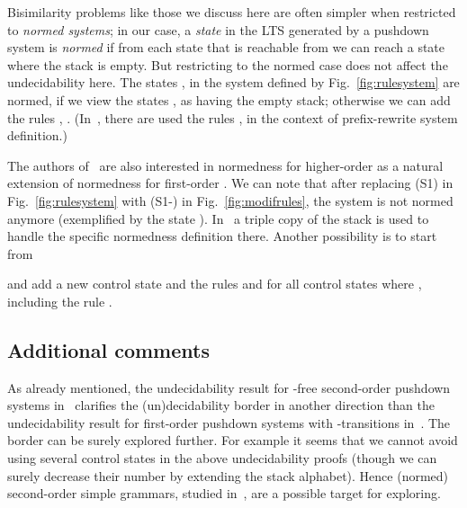 \documentclass[11pt]{article}
\newcommand{\pda}{\text{PDA}\xspace}
\begin{document}
Bisimilarity problems like those we discuss here
are
often simpler when restricted to \emph{normed systems};
in our case, a \emph{state}  in the LTS generated by  
a pushdown system is  \emph{normed} if from each
state that is reachable from  we can reach 
a state where the stack is empty.
But restricting to the normed case does not affect the undecidability
here.
The states ,  in the system 
defined by
Fig.~\ref{fig:rulesystem} are normed, if 
we view the states ,  as having the empty stack;
otherwise we can add
the rules
,
.
(In~\cite{DBLP:journals/jacm/JancarS08}, there are used
the rules ,
 in the context 
of prefix-rewrite system definition.)

The authors of~\cite{DBLP:conf/fsttcs/BroadbentG12} 
are also interested in normedness for higher-order \pda as a natural extension of normedness for
first-order \pda.
We can note that after replacing (S1) in 
Fig.~\ref{fig:rulesystem}
with (S1-)
in Fig.~\ref{fig:modifrules}, the system is
not normed anymore 
(exemplified by the state
).
In~\cite{DBLP:conf/fsttcs/BroadbentG12} a triple
copy of the stack 
is used to handle the specific normedness definition there.
Another possibility is to start from

and add a new control state  and
the rules  and
 for all control states 
where , 
including the rule .

\subsection*{Additional comments}

As already mentioned, the undecidability result 
for -free 
second-order pushdown systems 
in~\cite{DBLP:conf/fsttcs/BroadbentG12}
clarifies the (un)decidability border in another direction 
than the undecidability result 
for first-order pushdown systems with -transitions
in~\cite{DBLP:journals/jacm/JancarS08}.
The border can be surely explored further. 
For example it seems that we cannot avoid 
using several control states in the above undecidability proofs
(though we can surely decrease their number 
by extending the stack alphabet).
Hence (normed) second-order simple grammars, 
studied in~\cite{DBLP:conf/concur/Stirling06}, 
are a possible target for exploring.









\end{document}
